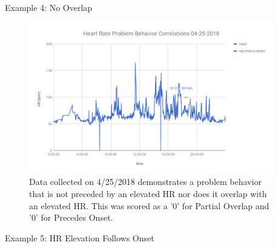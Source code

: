 \documentclass[final]{beamer}
\newlength{\onecolwid}
\newlength{\twocolwid}
\begin{document}
\begin{frame}[t]
\begin{columns}[t]
\begin{column}{\twocolwid}
\begin{columns}[t,totalwidth=\twocolwid]
\begin{column}{\onecolwid}
\end{column} %


\begin{column}{\onecolwid}\vspace{-.6in} %


\begin{block}{Example 4: No Overlap}
	
	\begin{figure}
		\includegraphics[width=0.8\linewidth]{Example4.png}
		\caption{Data collected on 4/25/2018 demonstrates a problem behavior that is not preceded by an elevated HR nor does it overlap with an elevated HR. This was scored as a '0' for Partial Overlap and '0' for Precedes Onset. }
	\end{figure}
	
\end{block}


\begin{block}{Example 5: HR Elevation Follows Onset}
	

\end{block}
\end{column}
\end{columns}
\end{column}
\end{columns}
\end{frame}
\end{document}
